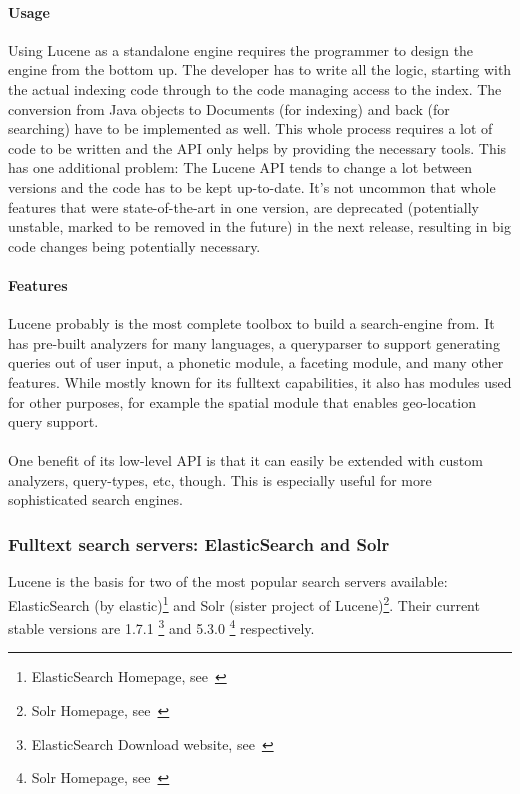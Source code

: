 \paragraph{Usage}
Using Lucene as a standalone engine requires the programmer to design the engine from the bottom up. The developer has to write all the logic, starting with the actual indexing code through to the code managing access to the index. The conversion from Java objects to Documents (for indexing) and back (for searching) have to be implemented as well. This whole process requires a lot of code to be written and the API only helps by providing the necessary tools. This has one additional problem: The Lucene API tends to change a lot between versions and the code has to be kept up-to-date. It's not uncommon that whole features that were state-of-the-art in one version, are deprecated (potentially unstable, marked to be removed in the future) in the next release, resulting in big code changes being potentially necessary.

\paragraph{Features}
Lucene probably is the most complete toolbox to build a search-engine from. It has pre-built analyzers for many languages, a queryparser to support generating queries out of user input, a phonetic module, a faceting module, and many other features. While mostly known for its fulltext capabilities, it also has modules used for other purposes, for example the spatial module that enables geo-location query support.
\\\\
One benefit of its low-level API is that it can easily be extended with custom analyzers, query-types, etc, though. This is especially useful for more sophisticated search engines.

\pagebreak

\subsubsection{Fulltext search servers: ElasticSearch and Solr}
Lucene is the basis for two of the most popular search servers available: ElasticSearch (by elastic)\footnote{ElasticSearch Homepage, see~\cite{elasticsearch_homepage}} and Solr (sister project of Lucene)\footnote{Solr Homepage, see~\cite{solr_homepage}}. Their current stable versions are 1.7.1 \footnote{ElasticSearch Download website, see~\cite{elasticsearch_downloads_website}} and 5.3.0 \footnote{Solr Homepage, see~\cite{solr_homepage}} respectively.

